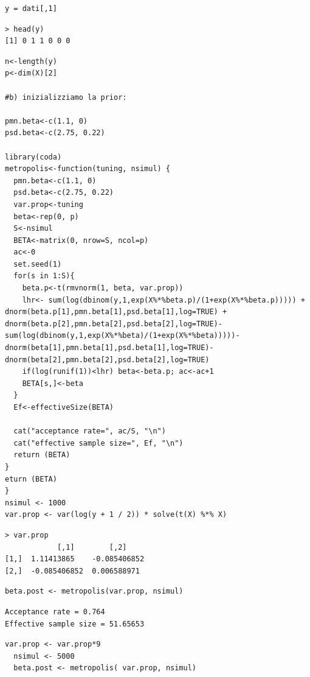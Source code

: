 \begin{lstlisting}[style=R]
y = dati[,1]
\end{lstlisting}

{
\color{red}
\begin{Verbatim}
> head(y)
[1] 0 1 1 0 0 0
\end{Verbatim}
}

\begin{lstlisting}[style=R]
n<-length(y)
p<-dim(X)[2]

#b) inizializziamo la prior:

pmn.beta<-c(1.1, 0)
psd.beta<-c(2.75, 0.22)

library(coda)
metropolis<-function(tuning, nsimul) {	
  pmn.beta<-c(1.1, 0)
  psd.beta<-c(2.75, 0.22)
  var.prop<-tuning
  beta<-rep(0, p)
  S<-nsimul
  BETA<-matrix(0, nrow=S, ncol=p)
  ac<-0
  set.seed(1)
  for(s in 1:S){
    beta.p<-t(rmvnorm(1, beta, var.prop))
    lhr<- sum(log(dbinom(y,1,exp(X%*%beta.p)/(1+exp(X%*%beta.p))))) + dnorm(beta.p[1],pmn.beta[1],psd.beta[1],log=TRUE) + dnorm(beta.p[2],pmn.beta[2],psd.beta[2],log=TRUE)-sum(log(dbinom(y,1,exp(X%*%beta)/(1+exp(X%*%beta)))))-dnorm(beta[1],pmn.beta[1],psd.beta[1],log=TRUE)-dnorm(beta[2],pmn.beta[2],psd.beta[2],log=TRUE)
    if(log(runif(1))<lhr) beta<-beta.p; ac<-ac+1
    BETA[s,]<-beta 
  }
  Ef<-effectiveSize(BETA)
  
  cat("acceptance rate=", ac/S, "\n")
  cat("effective sample size=", Ef, "\n")
  return (BETA)
}
eturn (BETA)
}
nsimul <- 1000
var.prop <- var(log(y + 1 / 2)) * solve(t(X) %*% X)
\end{lstlisting}

{
\color{red}
\begin{Verbatim}
> var.prop
            [,1]		[,2]
[1,]  1.11413865	-0.085406852
[2,]  -0.085406852	0.006588971
\end{Verbatim}
}

\begin{lstlisting}[style=R]
beta.post <- metropolis(var.prop, nsimul)
\end{lstlisting}

{
\color{red}
\begin{Verbatim}
Acceptance rate = 0.764
Effective sample size = 51.65653
\end{Verbatim}
}

\begin{lstlisting}[style=R]
  var.prop <- var.prop*9
  nsimul <- 5000
  beta.post <- metropolis( var.prop, nsimul)
\end{lstlisting}
  
